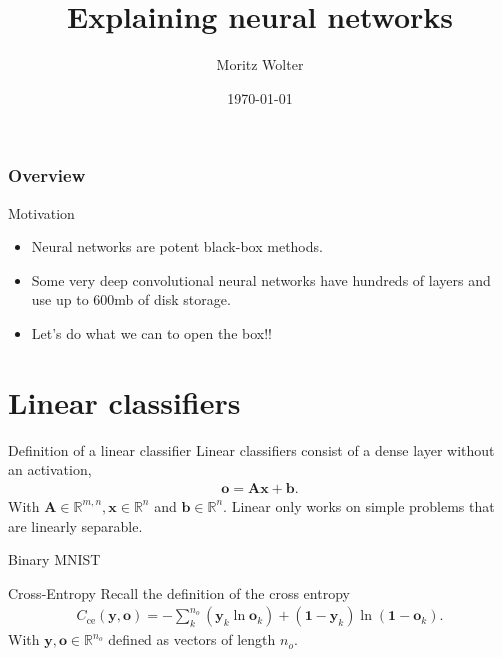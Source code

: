 \documentclass{beamer}
\title{Explaining neural networks}
\date{\today}
\institute{High-Performance Computing and Analytics Lab}
\author{Moritz Wolter}
\begin{document}
    \maketitle

    \begin{frame}
    \frametitle{Overview} 
    \tableofcontents
    \end{frame}

    \begin{frame}{Motivation}
      \begin{itemize}
        \item Neural networks are potent black-box methods.
        \item Some very deep convolutional neural networks have hundreds of layers and use up to 600mb of disk storage.
        \item Let's do what we can to open the box!!
      \end{itemize}
    \end{frame}

    \section{Linear classifiers}
    \begin{frame}{Definition of a linear classifier}
      Linear classifiers consist of a dense layer without an activation,
      \begin{align}
        \mathbf{o} = \mathbf{A}\mathbf{x} + \mathbf{b}.
      \end{align}
      With $\mathbf{A} \in \mathbb{R}^{m,n}, \mathbf{x} \in \mathbb{R}^{n}$ and $\mathbf{b} \in \mathbb{R}^{n}$.
      Linear only works on simple problems that are linearly separable.
    \end{frame}

    \begin{frame}{Binary MNIST}
      \begin{figure}
        
        
      \end{figure}
    \end{frame}

    \begin{frame}{Cross-Entropy}
      Recall the definition of the cross entropy
      \begin{align}
        C_{\text{ce}}(\mathbf{y}, \mathbf{o}) = -\sum_k^{n_o} ( \mathbf{y}_k  \ln \mathbf{o}_k) 
                                   + (\mathbf{1} - \mathbf{y}_k)
                                      \ln(\mathbf{1} - \mathbf{o}_k).
       \end{align}
       With $\mathbf{y},\mathbf{o} \in \mathbb{R}^{n_o}$ defined as vectors of length $n_o$.
    \end{frame}
\end{document}

